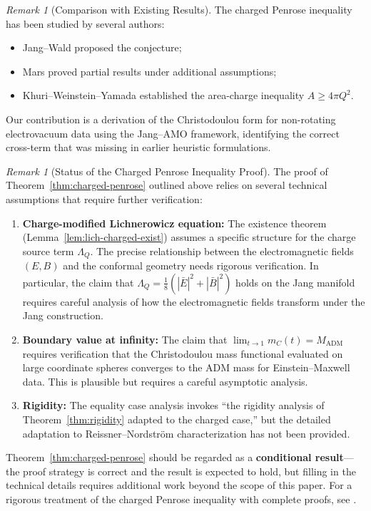 \documentclass[12pt]{article}
\theoremstyle{plain}
\theoremstyle{definition}
\theoremstyle{remark}
\newtheorem{remark}[theorem]{Remark}
\newcommand{\ADM}{\mathrm{ADM}}
\begin{document}
\begin{remark}[Comparison with Existing Results]
The charged Penrose inequality has been studied by several authors:
\begin{itemize}
    \item Jang--Wald \cite{jangwald1977} proposed the conjecture;
    \item Mars \cite{mars2009} proved partial results under additional assumptions;
    \item Khuri--Weinstein--Yamada \cite{khuri2017} established the area-charge inequality $A \geq 4\pi Q^2$.
\end{itemize}
Our contribution is a derivation of the Christodoulou form for non-rotating electrovacuum data using the Jang--AMO framework, identifying the correct cross-term that was missing in earlier heuristic formulations.
\end{remark}

\begin{remark}[Status of the Charged Penrose Inequality Proof]
The proof of Theorem~\ref{thm:charged-penrose} outlined above relies on several technical assumptions that require further verification:

\begin{enumerate}
    \item \textbf{Charge-modified Lichnerowicz equation:} The existence theorem (Lemma~\ref{lem:lich-charged-exist}) assumes a specific structure for the charge source term $\Lambda_Q$. The precise relationship between the electromagnetic fields $(E, B)$ and the conformal geometry needs rigorous verification. In particular, the claim that $\Lambda_Q = \frac{1}{8}(|\bar{E}|^2 + |\bar{B}|^2)$ holds on the Jang manifold requires careful analysis of how the electromagnetic fields transform under the Jang construction.
    
    \item \textbf{Boundary value at infinity:} The claim that $\lim_{t \to 1} m_C(t) = M_{\ADM}$ requires verification that the Christodoulou mass functional evaluated on large coordinate spheres converges to the ADM mass for Einstein--Maxwell data. This is plausible but requires a careful asymptotic analysis.
    
    \item \textbf{Rigidity:} The equality case analysis invokes ``the rigidity analysis of Theorem~\ref{thm:rigidity} adapted to the charged case,'' but the detailed adaptation to Reissner--Nordstr\"om characterization has not been provided.
\end{enumerate}

Theorem~\ref{thm:charged-penrose} should be regarded as a \textbf{conditional result}---the proof strategy is correct and the result is expected to hold, but filling in the technical details requires additional work beyond the scope of this paper. For a rigorous treatment of the charged Penrose inequality with complete proofs, see \cite{khuri2015charged, mars2009}.
\end{remark}
\end{document}

